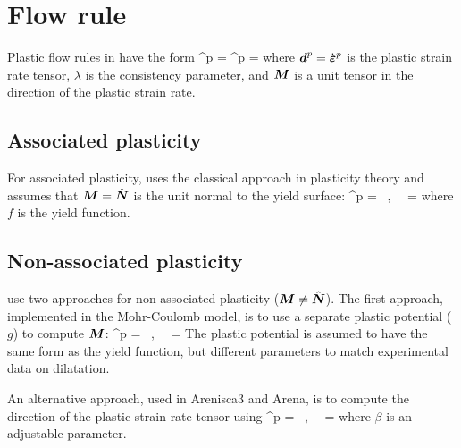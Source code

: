 \chapter{Flow rule}
Plastic flow rules in \Vaango have the form
\Beq
  \BdT^p = \dot{\BVeps}^p = \dot{\lambda}\BM
\Eeq
where $\boldsymbol{d}^p = \dot{\boldsymbol{\varepsilon}}^p$ is the plastic strain rate tensor, $\lambda$ is 
the consistency parameter, and $\boldsymbol{M}$ is a unit tensor in the direction of the
plastic strain rate.

\section{Associated plasticity}
For associated plasticity, \Vaango uses the classical approach in plasticity theory
and assumes that $\boldsymbol{M} = \hat{\boldsymbol{N}}$ is the unit normal to the yield surface:
\Beq
  \dot{\BVeps}^p = \dot{\lambda}\hat{\BN} 
  ~,~~ \hat{\BN} = 
\Eeq
where $f$ is the yield function.

\section{Non-associated plasticity}
\Vaango use two approaches for non-associated plasticity ($\boldsymbol{M} \ne \hat{\boldsymbol{N}}$).  
The first approach, implemented in the Mohr-Coulomb model, is to use a separate
plastic potential ($g$) to compute $\boldsymbol{M}$:
\Beq
  \dot{\BVeps}^p = \dot{\lambda} \hat{\BM} 
  ~,~~ \hat{\BM} = 
\Eeq
The plastic potential is assumed to have the same form as the yield function,
but different parameters to match experimental data on dilatation.

An alternative approach, used in Arenisca3 and Arena, is to compute the
direction of the plastic strain rate tensor using
\Beq
  \dot{\BVeps}^p = \dot{\lambda} \hat{\BM} 
  ~,~~ \hat{\BM} = \frac{\Dev(\BN) + \beta\, \Tr(\BN)}{\Norm{\Dev(\BN) + \beta\, \Tr(\BN)}{}}
\Eeq
where $\beta$ is an adjustable parameter.

